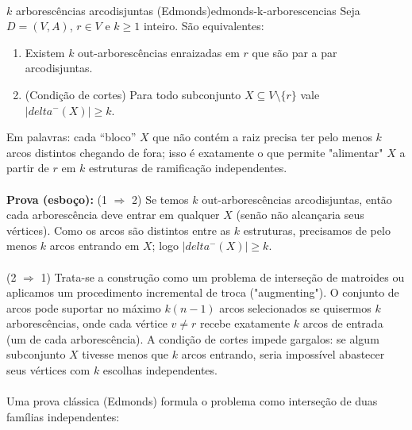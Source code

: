 \documentclass[12pt,a4paper]{article}
\def\emph#1{#1}%
\def\delta{delta}%
\begin{document}
\paragraph{}
\begin{teobox}{$k$ arborescências arcodisjuntas (Edmonds)}{edmonds-k-arborescencias}
Seja $D=(V,A)$, $r\in V$ e $k\ge 1$ inteiro. São equivalentes:
\begin{enumerate}\setlength{\itemsep}{4pt}
    \item Existem $k$ out-arborescências enraizadas em $r$ que são par a par \emph{arcodisjuntas}.
    \item (Condição de cortes) Para todo subconjunto $X\subseteq V\setminus\{r\}$ vale $|\delta^-(X)| \ge k$.
\end{enumerate}
Em palavras: cada “bloco” $X$ que não contém a raiz precisa ter pelo menos $k$ arcos distintos chegando de fora; isso é exatamente o que permite "alimentar" $X$ a partir de $r$ em $k$ estruturas de ramificação independentes.

\paragraph{}
\textbf{Prova (esboço):}
\emph{(1 $\Rightarrow$ 2)} Se temos $k$ out-arborescências arcodisjuntas, então cada arborescência deve entrar em qualquer $X$ (senão não alcançaria seus vértices). Como os arcos são distintos entre as $k$ estruturas, precisamos de pelo menos $k$ arcos entrando em $X$; logo $|\delta^-(X)|\ge k$.

\paragraph{}
\emph{(2 $\Rightarrow$ 1)} Trata-se a construção como um problema de \emph{interseção de matroides} ou aplicamos um procedimento incremental de troca ("augmenting"). O conjunto de arcos pode suportar no máximo $k(n-1)$ arcos selecionados se quisermos $k$ arborescências, onde cada vértice $v \neq r$ recebe exatamente $k$ arcos de entrada (um de cada arborescência). A condição de cortes impede gargalos: se algum subconjunto $X$ tivesse menos que $k$ arcos entrando, seria impossível abastecer seus vértices com $k$ escolhas independentes.

\paragraph{}
Uma prova clássica (Edmonds) formula o problema como interseção de duas famílias independentes: 


\end{teobox}
\end{document}

